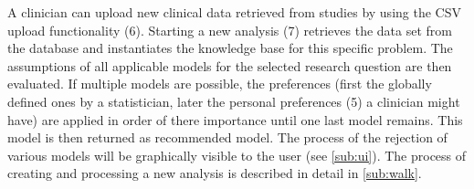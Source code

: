 A clinician can upload new clinical data retrieved from studies by using the CSV upload functionality (6). Starting a new analysis (7) retrieves the data set from the database and instantiates the knowledge base for this specific problem. The assumptions of all applicable models for the selected research question are then evaluated. If multiple models are possible, the preferences (first the globally defined ones by a statistician, later the personal preferences (5) a clinician might have) are applied in order of there importance until one last model remains. This model is then returned as recommended model. The process of the rejection of various models will be graphically visible to the user (see \autoref{sub:ui}). The process of creating and processing a new analysis is described in detail in \autoref{sub:walk}.


